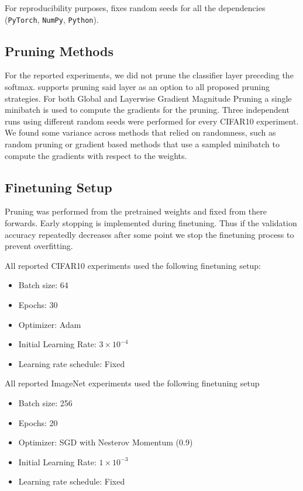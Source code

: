 For reproducibility purposes, \SB{} fixes random seeds for all the dependencies (\texttt{PyTorch}, \texttt{NumPy}, \texttt{Python}).


\subsection{Pruning Methods}

For the reported experiments, we did not prune the classifier layer preceding the softmax.
%
\SB{} supports pruning said layer as an option to all proposed pruning strategies.
%
For both Global and Layerwise Gradient Magnitude Pruning a single minibatch is used to compute the gradients for the pruning.
%
Three independent runs using different random seeds were performed for every CIFAR10 experiment.
%
We found some variance across methods that relied on randomness, such as random pruning or gradient based methods that use a sampled minibatch to compute the gradients with respect to the weights.


\subsection{Finetuning Setup}

Pruning was performed from the pretrained weights and fixed from there forwards.
%
%
Early stopping is implemented during finetuning.
%
Thus if the validation accuracy repeatedly decreases after some point we stop the finetuning process to prevent overfitting.
%

All reported CIFAR10 experiments used the following finetuning setup:
\begin{itemize}[leftmargin=4mm]
    \itemsep-2pt
    \vspace{-2mm}
    \item Batch size: 64
    \item Epochs: 30
    \item Optimizer: Adam
    \item Initial Learning Rate: $3 \times 10^{-4}$
    \item Learning rate schedule: Fixed
\end{itemize}
%
All reported ImageNet experiments used the following finetuning setup
\begin{itemize}[leftmargin=4mm]
    \itemsep-2pt
    \vspace{-2mm}
    \item Batch size: 256
    \item Epochs: 20
    \item Optimizer: SGD with Nesterov Momentum (0.9)
    \item Initial Learning Rate: $1 \times 10^{-3}$
    \item Learning rate schedule: Fixed
\end{itemize}

